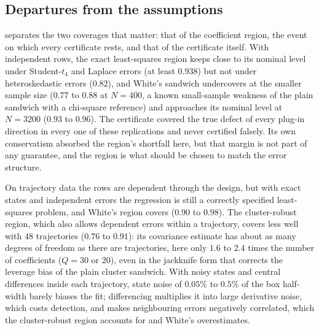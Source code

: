 \subsection{Departures from the assumptions}
\label{sec:robustness}



 separates the two coverages that matter: that of the
coefficient region, the event on which every certificate rests, and that of the
certificate itself. With independent rows, the exact least-squares region keeps
close to its nominal level under Student-$t_4$ and Laplace errors (at least
$0.938$) but not under heteroskedastic errors ($0.82$), and White's sandwich
undercovers at the smaller sample size ($0.77$ to $0.88$ at $N = 400$, a
known small-sample weakness of the plain sandwich with a chi-square reference)
and approaches its nominal level at $N = 3200$ ($0.93$ to $0.96$). The
certificate covered the true defect of every plug-in direction in every one of
these replications and never certified falsely. Its own conservatism absorbed
the region's shortfall here, but that margin is not part of any guarantee, and
the region is what should be chosen to match the error structure.

On trajectory data the rows are dependent through the design, but with exact
states and independent errors the regression is still a correctly specified
least-squares problem, and White's region covers ($0.90$ to $0.98$). The
cluster-robust region, which also allows dependent errors within a trajectory,
covers less well with $48$ trajectories ($0.76$ to $0.91$): its covariance
estimate has about as many degrees of freedom as there are trajectories, here
only $1.6$ to $2.4$ times the number of coefficients ($Q = 30$ or $20$), even
in the jackknife form that corrects the leverage bias of the plain cluster
sandwich. With noisy states and central differences inside each trajectory,
state noise of $0.05\%$ to $0.5\%$ of the box half-width barely biases the
fit; differencing multiplies it into large derivative noise, which costs
detection, and makes neighbouring errors negatively correlated, which the
cluster-robust region accounts for and White's overestimates.

